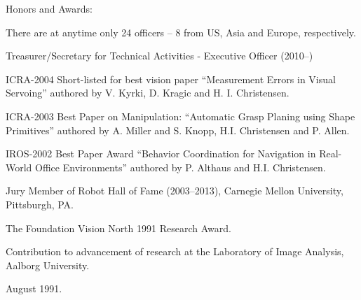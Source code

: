 \documentclass{article}
\newenvironment{sublist}{%
  \begin{list}{}{%
      \setlength{\itemsep}{0em}\setlength{\parsep}{0em}%
      \setlength{\topsep}{0em}\setlength{\parskip}{0em}%
    }%
}%
{ \end{list} }
\begin{document}
\begin{cv}
\begin{cvlist}{Honors and Awards:}
  \begin{sublist}
  \item There are at anytime only 24 officers -- 8 from US, Asia and Europe,
    respectively.
  \item Treasurer/Secretary for Technical Activities - Executive
    Officer (2010--)
  \end{sublist}
\item ICRA-2004 Short-listed for best vision paper ``Measurement
  Errors in Visual Servoing'' authored by V. Kyrki, D. Kragic and H.
  I. Christensen.
\item ICRA-2003 Best Paper on Manipulation:  ``Automatic
  Grasp Planing using Shape Primitives'' authored by A. Miller and
  S. Knopp, H.I. Christensen and P. Allen.
\item IROS-2002 Best Paper Award ``Behavior Coordination for
  Navigation in Real-World Office Environments'' authored by
  P. Althaus and H.I. Christensen.
\item Jury Member of Robot Hall of Fame (2003--2013), Carnegie Mellon
  University, Pittsburgh, PA.
\item The Foundation Vision North 1991 Research Award.
  \begin{sublist}
  \item Contribution to advancement of research at the Laboratory of
    Image Analysis, Aalborg University.
  \item August 1991.
  \end{sublist}
\end{cvlist}
\end{cv}
\end{document}

